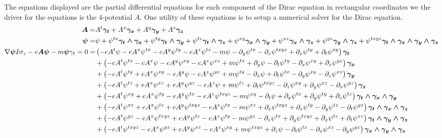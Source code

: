 \documentclass[letterpaper,10pt,english]{sphinxmanual}
\begin{document}
The equations displayed are the partial differential equations for each component of the Dirac equation
in rectangular coordinates we the driver for the equations is the 4-potential $A$.  One utility
of these equations is to setup a numerical solver for the Dirac equation.
  \begin{align*}
  \boldsymbol{A} =& A^{t}\boldsymbol{\gamma_{t}}+A^{x}\boldsymbol{\gamma_{x}}+A^{y}\boldsymbol{\gamma_{y}}+A^{z}\boldsymbol{\gamma_{z}} \\
  \boldsymbol{\psi} =& \psi+\psi^{tx}\boldsymbol{\gamma_{t}\wedge \gamma_{x}}+\psi^{ty}\boldsymbol{\gamma_{t}\wedge \gamma_{y}}+\psi^{tz}\boldsymbol{\gamma_{t}\wedge \gamma_{z}}+\psi^{xy}\boldsymbol{\gamma_{x}\wedge \gamma_{y}}+\psi^{xz}\boldsymbol{\gamma_{x}\wedge \gamma_{z}}+\psi^{yz}\boldsymbol{\gamma_{y}\wedge \gamma_{z}}+\psi^{txyz}\boldsymbol{\gamma_{t}\wedge \gamma_{x}\wedge \gamma_{y}\wedge \gamma_{z}} \\
  \nabla \boldsymbol{\psi} I \sigma_{z}-e\boldsymbol{A}\boldsymbol{\psi}-m\boldsymbol{\psi}\gamma_{t} = 0 =  & \left ( - e A^{t} \psi - e A^{x} \psi^{tx} - e A^{y} \psi^{ty} - e A^{z} \psi^{tz} - m \psi - \partial_{y} \psi^{tx} - \partial_{z} \psi^{txyz} + \partial_{x} \psi^{ty} + \partial_{t} \psi^{xy}\right ) \boldsymbol{\gamma_{t}} \\
  & +\left ( - e A^{t} \psi^{tx} - e A^{x} \psi - e A^{y} \psi^{xy} - e A^{z} \psi^{xz} + m \psi^{tx} + \partial_{y} \psi - \partial_{t} \psi^{ty} - \partial_{x} \psi^{xy} + \partial_{z} \psi^{yz}\right ) \boldsymbol{\gamma_{x}} \\
  & +\left ( - e A^{t} \psi^{ty} + e A^{x} \psi^{xy} - e A^{y} \psi - e A^{z} \psi^{yz} + m \psi^{ty} - \partial_{x} \psi + \partial_{t} \psi^{tx} - \partial_{y} \psi^{xy} - \partial_{z} \psi^{xz}\right ) \boldsymbol{\gamma_{y}} \\
  & +\left ( - e A^{t} \psi^{tz} + e A^{x} \psi^{xz} + e A^{y} \psi^{yz} - e A^{z} \psi + m \psi^{tz} + \partial_{t} \psi^{txyz} - \partial_{z} \psi^{xy} + \partial_{y} \psi^{xz} - \partial_{x} \psi^{yz}\right ) \boldsymbol{\gamma_{z}} \\
  & +\left ( - e A^{t} \psi^{xy} + e A^{x} \psi^{ty} - e A^{y} \psi^{tx} - e A^{z} \psi^{txyz} - m \psi^{xy} - \partial_{t} \psi + \partial_{x} \psi^{tx} + \partial_{y} \psi^{ty} + \partial_{z} \psi^{tz}\right ) \boldsymbol{\gamma_{t}\wedge \gamma_{x}\wedge \gamma_{y}} \\
  & +\left ( - e A^{t} \psi^{xz} + e A^{x} \psi^{tz} + e A^{y} \psi^{txyz} - e A^{z} \psi^{tx} - m \psi^{xz} + \partial_{x} \psi^{txyz} + \partial_{z} \psi^{ty} - \partial_{y} \psi^{tz} - \partial_{t} \psi^{yz}\right ) \boldsymbol{\gamma_{t}\wedge \gamma_{x}\wedge \gamma_{z}} \\
  & +\left ( - e A^{t} \psi^{yz} - e A^{x} \psi^{txyz} + e A^{y} \psi^{tz} - e A^{z} \psi^{ty} - m \psi^{yz} - \partial_{z} \psi^{tx} + \partial_{y} \psi^{txyz} + \partial_{x} \psi^{tz} + \partial_{t} \psi^{xz}\right ) \boldsymbol{\gamma_{t}\wedge \gamma_{y}\wedge \gamma_{z}} \\
  & +\left ( - e A^{t} \psi^{txyz} - e A^{x} \psi^{yz} + e A^{y} \psi^{xz} - e A^{z} \psi^{xy} + m \psi^{txyz} + \partial_{z} \psi - \partial_{t} \psi^{tz} - \partial_{x} \psi^{xz} - \partial_{y} \psi^{yz}\right ) \boldsymbol{\gamma_{x}\wedge \gamma_{y}\wedge \gamma_{z}}
  \end{align*}
\end{document}

